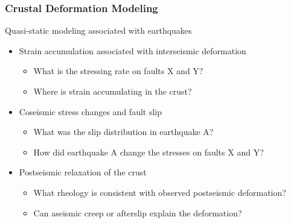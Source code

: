 \documentclass[aspectratio=169,hyperref=colorlinks]{beamer}
\begin{document}
\begin{frame}
  \frametitle{Crustal Deformation Modeling}

  \vfill
  Quasi-static modeling associated with earthquakes
  \vfill

  \begin{itemize}
  \item Strain accumulation associated with interseismic deformation
    \begin{itemize}
    \item What is the stressing rate on faults X and Y?
    \item Where is strain accumulating in the crust?
    \end{itemize}
  \item Coseismic stress changes and fault slip
    \begin{itemize}
    \item What was the slip distribution in earthquake A?
    \item How did earthquake A change the stresses on faults X and Y?
    \end{itemize}
  \item Postseismic relaxation of the crust
    \begin{itemize}
    \item What rheology is consistent with observed postseismic deformation?
    \item Can aseismic creep or afterslip explain the deformation?
    \end{itemize}
  \end{itemize}
  \vfill

\end{frame}
\end{document}

